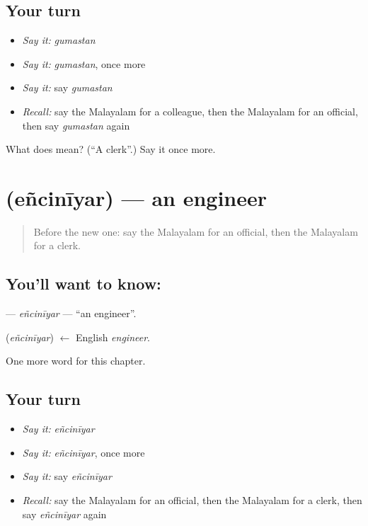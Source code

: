 \subsection*{Your turn}
\begin{itemize}
\raggedright
  \item \emph{Say it:} \emph{gumastan}
  \item \emph{Say it:} \emph{gumastan}, once more
  \item \emph{Say it:} say \emph{gumastan}
  \item \emph{Recall:} say the Malayalam for a colleague, then the Malayalam for an official, then say \emph{gumastan} again
\end{itemize}

\begin{tcolorbox}[breakable,colback=teal!4,colframe=teal!35!black,title={Before you move on}]
What does  mean? (\textquotedblleft{}A clerk\textquotedblright{}.) Say it once more.
\end{tcolorbox}
\section[\texorpdfstring{\ml{എഞ്ചിനീയർ} (eñcinīyar)}{എഞ്ചിനീയർ (eñcinīyar)}]{ (eñcinīyar) — an engineer}

\label{lesson:ML-C220-enciniyar}



\begin{quote}
Before the new one: say the Malayalam for an official, then the Malayalam for a clerk.
\end{quote}

\subsection*{You'll want to know: }
\textbf{} — \emph{eñcinīyar} — \textquotedblleft{}an engineer\textquotedblright{}.

\begin{cousinweb}
\textbf{} (\emph{eñcinīyar}) $\leftarrow$ English \emph{engineer}.
\end{cousinweb}

\begin{grammarlens}[title={What you've built}]
One more word for this chapter.
\end{grammarlens}

\subsection*{Your turn}
\begin{itemize}
\raggedright
  \item \emph{Say it:} \emph{eñcinīyar}
  \item \emph{Say it:} \emph{eñcinīyar}, once more
  \item \emph{Say it:} say \emph{eñcinīyar}
  \item \emph{Recall:} say the Malayalam for an official, then the Malayalam for a clerk, then say \emph{eñcinīyar} again
\end{itemize}

